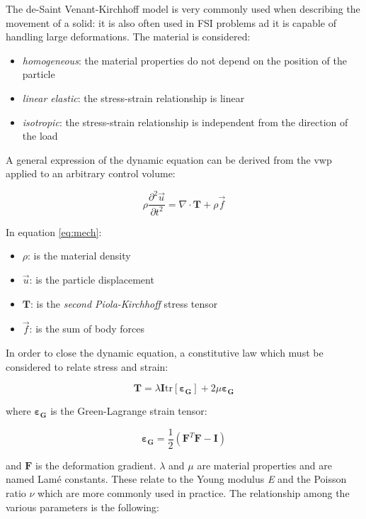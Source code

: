 The  de-Saint Venant-Kirchhoff model \cite{ogden1997non} is very commonly used when describing the movement of a solid: it is also often used in FSI problems ad it is capable of handling large deformations. The material is considered:

\begin{itemize}
	\item \textit{homogeneous}: the material properties do not depend on the position of the particle
	\item \textit{linear elastic}: the stress-strain relationship is linear
	\item \textit{isotropic}: the stress-strain relationship is independent from the direction of the load
\end{itemize}

A general expression of the dynamic equation can be derived from the \acrfull{vwp} applied to an arbitrary control volume: 

\begin{equation}
	\label{eq:mech}
	\rho \frac{\partial^2 \vec{u} }{\partial t^2} = \nabla \cdot \mathbf{T} + \rho \vec{f}
\end{equation}

In equation \ref{eq:mech}:

\begin{itemize}
	\item $\rho$: is the material density
	\item $\vec{u}$: is the particle displacement
	\item $\mathbf{T}$: is the \textit{second Piola-Kirchhoff} stress tensor
	\item $\vec{f}$: is the sum of body forces
\end{itemize}


In order to close the dynamic equation, a constitutive law which must be considered to relate stress and strain:

\begin{equation}
	\mathbf{T} = \lambda \mathbf{I} \mathrm{tr}\left[ \bm{\varepsilon_G}  \right]  + 2\mu \bm{\varepsilon_G}
\end{equation}

where $\bm{\varepsilon_G}$ is the Green-Lagrange strain tensor:

\begin{equation}
	\bm{\varepsilon_G} = \frac{1}{2}\left( \mathbf{F}^T \mathbf{F}-\mathbf{I}  \right)
\end{equation}

and $\mathbf{F}$ is the deformation gradient. $\lambda$ and $\mu$ are material properties and are named Lamé constants. These relate to the Young modulus \textit{E} and the Poisson ratio $\nu$ which are more commonly used in practice. The relationship among the various parameters is the following:


